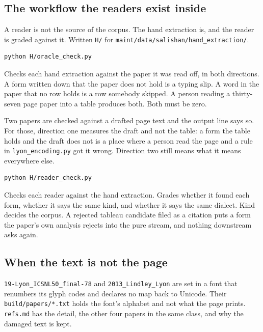 \subsection{The workflow the readers exist inside}

A reader is not the source of the corpus. The hand extraction is, and the reader is graded against it. Written \texttt{H/\allowbreak{}} for \texttt{maint/\allowbreak{}data/\allowbreak{}salishan/\allowbreak{}hand\_\allowbreak{}extraction/\allowbreak{}}.

\begin{lstlisting}[breaklines=true,breakatwhitespace=false,basicstyle=\ttfamily\small]
python H/oracle_check.py
\end{lstlisting}

Checks each hand extraction against the paper it was read off, in both directions. A form written down that the paper does not hold is a typing slip. A word in the paper that no row holds is a row somebody skipped. A person reading a thirty-seven page paper into a table produces both. Both must be zero.

Two papers are checked against a drafted page text and the output line says so. For those, direction one measures the draft and not the table: a form the table holds and the draft does not is a place where a person read the page and a rule in \texttt{lyon\_\allowbreak{}encoding.\allowbreak{}py} got it wrong. Direction two still means what it means everywhere else.

\begin{lstlisting}[breaklines=true,breakatwhitespace=false,basicstyle=\ttfamily\small]
python H/reader_check.py
\end{lstlisting}

Checks each reader against the hand extraction. Grades whether it found each form, whether it says the same kind, and whether it says the same dialect. Kind decides the corpus. A rejected tableau candidate filed as a citation puts a form the paper's own analysis rejects into the pure stream, and nothing downstream asks again.

\subsection{When the text is not the page}

\texttt{19-\allowbreak{}Lyon\_\allowbreak{}ICSNL50\_\allowbreak{}final-\allowbreak{}78} and \texttt{2013\_\allowbreak{}Lindley\_\allowbreak{}Lyon} are set in a font that renumbers its glyph codes and declares no map back to Unicode. Their \texttt{build/\allowbreak{}papers/\allowbreak{}*.\allowbreak{}txt} holds the font's alphabet and not what the page prints. \texttt{refs.\allowbreak{}md} has the detail, the other four papers in the same class, and why the damaged text is kept.

